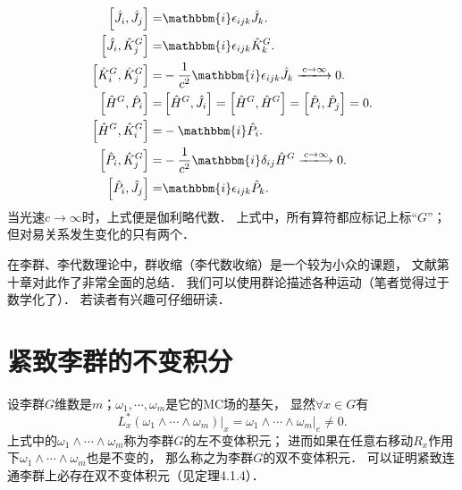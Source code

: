 \begin{subequations}
    \begin{align}
        \left[\hat{J}_i, \hat{J}_j \right] =& \mathbbm{i} \epsilon_{ijk} \hat{J}_k . \\
        \left[\hat{J}_i, \hat{K}_j^G\right] =& \mathbbm{i} \epsilon_{ijk} \hat{K}_k ^G. \\
        \left[\hat{K}_i^G, \hat{K}_j^G\right] =& -\frac{1}{c^2}\mathbbm{i}\epsilon_{ijk} \hat{J}_k 
        \xlongrightarrow{c\to \infty} 0. \\
        \left[\hat{H}^G, \hat{P}_i \right] =& \left[\hat{H}^G, \hat{J}_i \right]
        =\left[\hat{H}^G, \hat{H}^G \right] =\left[\hat{P}_i, \hat{P}_j \right] =0 . \\
        \left[\hat{H}^G, \hat{K}^G_i \right] = & -\mathbbm{i} \hat{P}_i .\\
        \left[\hat{P}_i, \hat{K}^G_j \right] =& -\frac{1}{c^2}\mathbbm{i} \delta_{ij} \hat{H}^G 
        \xlongrightarrow{c\to \infty} 0.\\
        \left[\hat{P}_i, \hat{J}_j \right] =& \mathbbm{i} \epsilon_{ijk} \hat{P}_k .
    \end{align}
\end{subequations}
当光速$c\to \infty$时，上式便是伽利略代数．
上式中，所有算符都应标记上标“$G$”；但对易关系发生变化的只有两个．

在李群、李代数理论中，群收缩（李代数收缩）是一个较为小众的课题，
文献\parencite{Gilmore-1974}第十章对此作了非常全面的总结．
我们可以使用群论描述各种运动\cite{McRae-2007}（笔者觉得过于数学化了）．
若读者有兴趣可仔细研读．



\section{紧致李群的不变积分}\label{chlg:sec_Integral}

设李群$G$维数是$m$；$\omega_1,\cdots,\omega_m$是它的MC场的基矢，
显然$\forall x\in G$有
\begin{equation}
    L_x^* (\omega_1 \wedge\cdots\wedge\omega_m)|_{x} = \left.\omega_1 \wedge\cdots\wedge\omega_m\right|_{e}
    \neq 0.
\end{equation}
上式中的$\omega_1 \wedge\cdots\wedge\omega_m$称为李群$G$的左不变体积元；
进而如果在任意右移动$R_x$作用下$\omega_1 \wedge\cdots\wedge\omega_m$也是不变的，
那么称之为李群$G$的{\heiti 双不变体积元}．
可以证明紧致连通李群上必存在双不变体积元（见\parencite[p. 288]{xuyc-2001}定理4.1.4）．


